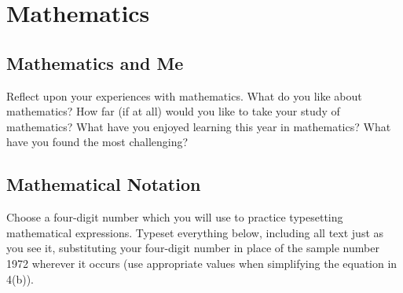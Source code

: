 \documentclass{article}
\begin{document}
\section{Mathematics}

\subsection{Mathematics and Me}
Reflect upon your experiences with mathematics. What do you like about mathematics? How far (if at all) would you like to take your study of mathematics? What have you enjoyed learning this year in mathematics? What have you found the most challenging?

\subsection{Mathematical Notation}
Choose a four-digit number which you will use to practice typesetting mathematical expressions. Typeset everything below, including all text just as you see it, substituting your four-digit number in place of the sample number 1972 wherever it occurs (use appropriate values when simplifying the equation in 4(b)).
\end{document}
